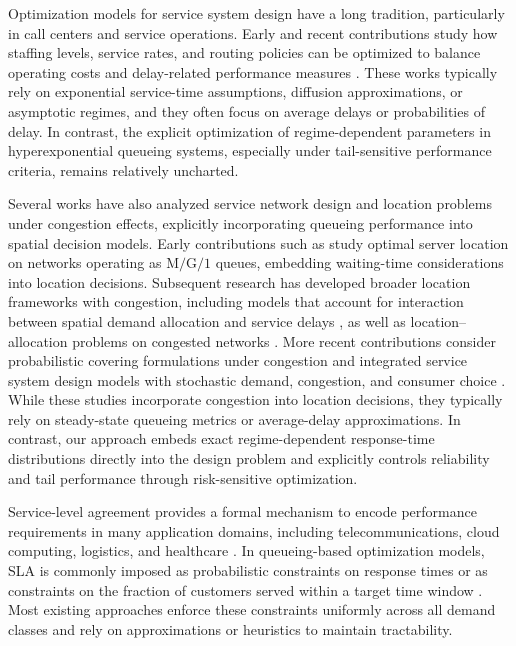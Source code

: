 \documentclass[letter,11pt, reqno]{amsart}
\begin{document}
Optimization models for service system design have a long tradition, particularly
in call centers and service operations.
Early and recent contributions study how staffing levels, service rates, and
routing policies can be optimized to balance operating costs and delay-related
performance measures
\citep{Borst2004,Garnett2002,goez2017second,GurvichWhitt2009,HarrisonZeevi2005,hassin2003queue,Long2024generalized,Tsitsiklis2017flexible,Zychlinski2023managing}.
These works typically rely on exponential service-time assumptions, diffusion
approximations, or asymptotic regimes, and they often focus on average delays or
probabilities of delay.
In contrast, the explicit optimization of regime-dependent parameters in
hyperexponential queueing systems, especially under tail-sensitive performance
criteria, remains relatively uncharted.

Several works have also analyzed service network design  and location problems under congestion effects, explicitly incorporating queueing performance into spatial decision models. Early contributions such as \citep{berman1985} study optimal server location on networks operating as $\mathrm{M}/\mathrm{G}/1$ queues, embedding waiting-time considerations into location decisions. Subsequent research has developed broader location frameworks with congestion, including models that account for interaction between spatial demand allocation and service delays \citep{berman2003location}, as well as location--allocation problems on congested networks \citep{aboolian2008location}. More recent contributions consider probabilistic covering formulations under congestion \citep{aboolian2022probabilistic} and integrated service system design models with stochastic demand, congestion, and consumer choice \citep{aboolian2022efficient}. While these studies incorporate congestion into location decisions, they typically rely on steady-state queueing metrics or average-delay approximations. In contrast, our approach embeds exact regime-dependent response-time distributions directly into the design problem and explicitly controls reliability and tail performance through risk-sensitive optimization.

Service-level agreement provides a formal mechanism to encode performance
requirements in many application domains, including telecommunications, cloud
computing, logistics, and healthcare
\citep{HarcholBalter2013,jain2002sla}.
In queueing-based optimization models, SLA is commonly imposed as probabilistic
constraints on response times or as constraints on the fraction of customers
served within a target time window
\citep{cheng2013staffing,soh2017call}.
Most existing approaches enforce these constraints uniformly across all demand
classes and rely on approximations or heuristics to maintain tractability.
\end{document}
